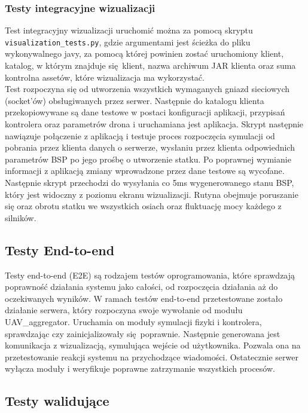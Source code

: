 \documentclass[15pt]{sprawozdanie}
\begin{document}
\subsubsection{Testy integracyjne wizualizacji}

Test integracyjny wizualizacji uruchomić można za pomocą skryptu \\ \texttt{visualization\_tests.py}, gdzie argumentami jest ścieżka do pliku wykonywalnego javy, za pomocą której powinien zostać uruchomiony klient, katalog, w którym znajduje się klient, nazwa archiwum JAR klienta oraz suma kontrolna assetów, które wizualizacja ma wykorzystać. \\


Test rozpoczyna się od utworzenia wszystkich wymaganych gniazd sieciowych (socket'ów) obsługiwanych przez serwer. Następnie do katalogu klienta przekopiowywane są dane testowe w postaci konfiguracji aplikacji, przypisań kontrolera oraz parametrów drona i uruchamiana jest aplikacja. Skrypt następnie nawiązuje połączenie z aplikacją i testuje proces rozpoczęcia symulacji od pobrania przez klienta danych o serwerze, wysłaniu przez klienta odpowiednich parametrów BSP po jego prośbę o utworzenie statku. Po poprawnej wymianie informacji z aplikacją zmiany wprowadzone przez dane testowe są wycofane. Następnie skrypt przechodzi do wysyłania co 5ms wygenerowanego stanu BSP, który jest widoczny z poziomu ekranu wizualizacji. Rutyna obejmuje poruszanie się oraz obrotu statku we wszystkich osiach oraz fluktuację mocy każdego z silników.  

\subsection{Testy End-to-end}

Testy end-to-end (E2E) są rodzajem testów oprogramowania, które sprawdzają poprawność działania systemu jako całości, od rozpoczęcia działania aż do oczekiwanych wyników. W ramach testów end-to-end przetestowane zostało działanie serwera, który rozpoczyna swoje wywołanie od modułu UAV\_aggregator. Uruchamia on moduły symulacji fizyki i kontrolera, sprawdzając czy zainicjalizowały się poprawnie. 
Następnie generowana jest komunikacja z wizualizacją, symulująca wejście od użytkownika. Pozwala ona na przetestowanie reakcji systemu na przychodzące wiadomości.
Ostatecznie serwer wyłącza moduły i weryfikuje poprawne zatrzymanie wszystkich procesów. 

\subsection{Testy walidujące}
\end{document}
